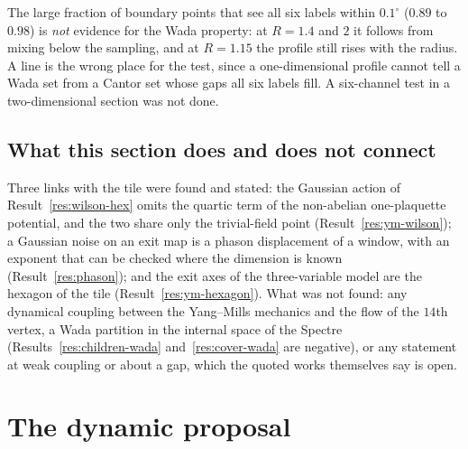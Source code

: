 \documentclass[11pt]{article}
\theoremstyle{definition}
\begin{document}
The large fraction of boundary points that see all six labels within $0.1^\circ$ ($0.89$ to $0.98$) is \emph{not} evidence for the Wada property: at $R=1.4$ and $2$ it follows from mixing below the sampling, and at $R=1.15$ the profile still rises with the radius. A line is the wrong place for the test, since a one-dimensional profile cannot tell a Wada set from a Cantor set whose gaps all six labels fill. A six-channel test in a two-dimensional section was not done.

\subsection{What this section does and does not connect}\label{sec:ym-limits}
Three links with the tile were found and stated: the Gaussian action of Result~\ref{res:wilson-hex} omits the quartic term of the non-abelian one-plaquette potential, and the two share only the trivial-field point (Result~\ref{res:ym-wilson}); a Gaussian noise on an exit map is a phason displacement of a window, with an exponent that can be checked where the dimension is known (Result~\ref{res:phason}); and the exit axes of the three-variable model are the hexagon of the tile (Result~\ref{res:ym-hexagon}). What was not found: any dynamical coupling between the Yang--Mills mechanics and the flow of the $14$th vertex, a Wada partition in the internal space of the Spectre (Results~\ref{res:children-wada} and~\ref{res:cover-wada} are negative), or any statement at weak coupling or about a gap, which the quoted works themselves say is open.


\section{The dynamic proposal}\label{sec:dynamic}
\end{document}
